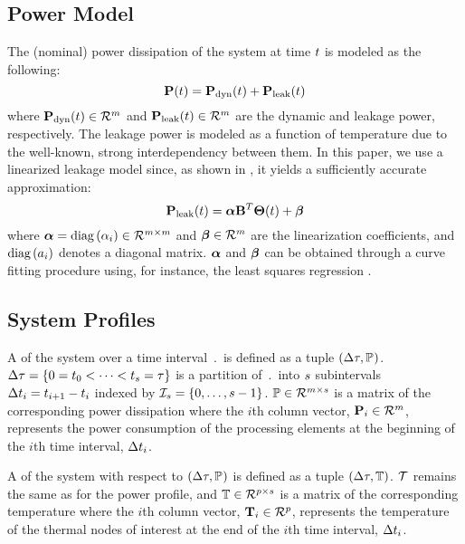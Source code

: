 \subsection{Power Model} 
The (nominal) power dissipation of the system at time $t$ is modeled as the following:
\[
  \mathbf{P}(t) = \mathbf{P}_{\text{dyn}}(t) + \mathbf{P}_{\text{leak}}(t)
\]
where $\mathbf{P}_{\text{dyn}}(t) \in \mathcal{R}^{m}$ and $\mathbf{P}_{\text{leak}}(t) \in \mathcal{R}^{m}$ are the dynamic and leakage power, respectively. The leakage power is modeled as a function of temperature due to the well-known, strong interdependency between them. In this paper, we use a linearized leakage model since, as shown in \cite{liu2007}, it yields a sufficiently accurate approximation:
\begin{equation} \label{leakage-power}
  \mathbf{P}_{\text{leak}}(t) = \boldsymbol\alpha \mathbf{B}^T \mathbf{\Theta}(t) + \boldsymbol\beta
\end{equation}
where $\boldsymbol\alpha = \text{diag}\left(\alpha_i\right) \in \mathcal{R}^{m \times m}$ and $\boldsymbol\beta \in \mathcal{R}^{m}$ are the linearization coefficients, and $\text{diag}\left(a_i\right)$ denotes a diagonal matrix. $\boldsymbol\alpha$ and $\boldsymbol\beta$ can be obtained through a curve fitting procedure using, for instance, the least squares regression \cite{press2007}.

\subsection{System Profiles} 
A  of the system over a time interval $\period$ is defined as a tuple $(\Delta \tau, \mathbb{P}_{})$. $\Delta \tau = \{ 0 = t_0 < \dots < t_{s} = \tau \}$ is a partition of $\period$ into $s$ subintervals $\Delta t_i = t_{i+1} - t_i$ indexed by $\mathcal{I}_s = \{ 0, \dots, s - 1 \}$. $\mathbb{P} \in \mathcal{R}^{m \times s}$ is a matrix of the corresponding power dissipation where the $i$th column vector, $\mathbf{P}_i \in \mathcal{R}^{m}$, represents the power consumption of the processing elements at the beginning of the $i$th time interval, $\Delta t_i$.

A  of the system with respect to $(\Delta \tau, \mathbb{P}_{})$ is defined as a tuple $(\Delta \tau, \mathbb{T})$. $\mathcal{T}$ remains the same as for the power profile, and $\mathbb{T} \in \mathcal{R}^{p \times s}$ is a matrix of the corresponding temperature where the $i$th column vector, $\mathbf{T}_i \in \mathcal{R}^{p}$, represents the temperature of the thermal nodes of interest at the end of the $i$th time interval, $\Delta t_i$.

